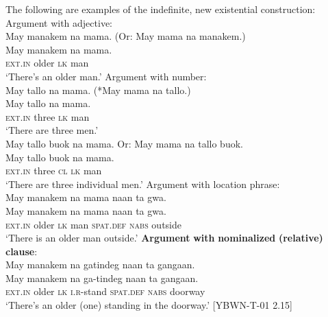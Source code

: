 The following are examples of the indefinite, new existential construction:
\ea
\label{bkm:Ref329889347}
Argument with adjective: \\
May  manakem  na  mama. (Or: May mama na manakem.) \\\smallskip
\gll May  manakem  na  mama. \\
\textsc{ext.in}  older  \textsc{lk}  man \\
\glt ‘There’s an older man.’
\z
\ea
Argument with number: \\
May  tallo  na  mama. (*May mama na tallo.) \\\smallskip
\gll  May  tallo  na  mama. \\
\textsc{ext.in}  three  \textsc{lk}  man \\
\glt ‘There are three men.’ \\
\z
\ea
May tallo buok na mama. Or: May mama na tallo buok. \\\smallskip
\gll May tallo buok na mama. \\
\textsc{ext.in}  three  \textsc{cl} \textsc{lk}  man \\
\glt ‘There are three individual men.’
\z
\ea
Argument with location phrase:\footnotemark \\
May  manakem  na  mama  naan  ta  gwa.  \\\smallskip
\gll  May  manakem  na  mama  naan  ta  gwa.  \\
\textsc{ext.in}  older  \textsc{lk}  man  \textsc{spat.def}  \textsc{nabs}  outside \\
\glt ‘There is an older man outside.’
\z
\ea
\label{bkm:Ref442938611}\textbf{Argument} \textbf{with} \textbf{nominalized} \textbf{(relative)} \textbf{clause}: \\
May   manakem  na  gatindeg  naan  ta  gangaan. \\\smallskip
\gll  May   manakem  na  ga-tindeg  naan  ta  gangaan. \\
\textsc{ext.in} older  \textsc{lk}  \textsc{i.r}-stand  \textsc{spat.def}  \textsc{nabs}  doorway \\
\glt ‘There’s an older (one) standing in the doorway.’ [YBWN-T-01 2.15]
\z

